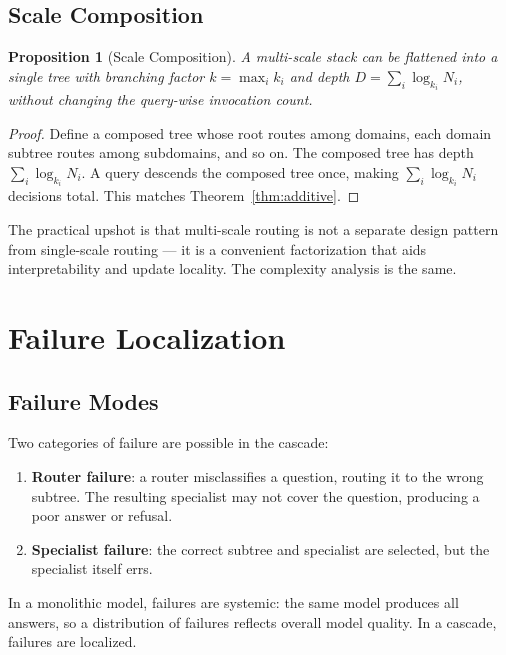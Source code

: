 \documentclass[11pt,twocolumn,a4paper]{article}
\newtheorem{proposition}[theorem]{Proposition}
\theoremstyle{definition}
\theoremstyle{remark}
\begin{document}
\subsection{Scale Composition}

\begin{proposition}[Scale Composition]
\label{prop:compose}
A multi-scale stack can be flattened into a single tree with branching factor $k = \max_i k_i$ and depth $D = \sum_i \log_{k_i} N_i$, without changing the query-wise invocation count.
\end{proposition}

\begin{proof}
Define a composed tree whose root routes among domains, each domain subtree routes among subdomains, and so on. The composed tree has depth $\sum_i \log_{k_i} N_i$. A query descends the composed tree once, making $\sum_i \log_{k_i} N_i$ decisions total. This matches Theorem~\ref{thm:additive}.
\end{proof}

The practical upshot is that multi-scale routing is not a separate design pattern from single-scale routing --- it is a convenient factorization that aids interpretability and update locality. The complexity analysis is the same.

\section{Failure Localization}
\label{sec:failure}

\subsection{Failure Modes}

Two categories of failure are possible in the cascade:
\begin{enumerate}
    \item \textbf{Router failure}: a router misclassifies a question, routing it to the wrong subtree. The resulting specialist may not cover the question, producing a poor answer or refusal.
    \item \textbf{Specialist failure}: the correct subtree and specialist are selected, but the specialist itself errs.
\end{enumerate}

In a monolithic model, failures are systemic: the same model produces all answers, so a distribution of failures reflects overall model quality. In a cascade, failures are localized.
\end{document}
